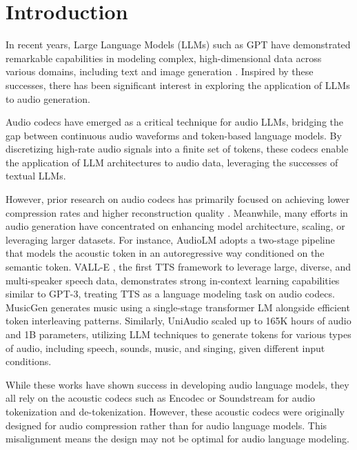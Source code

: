 \section{Introduction}
 
In recent years, Large Language Models (LLMs) such as GPT \cite{brown2020language} have demonstrated remarkable capabilities in modeling complex, high-dimensional data across various domains, including text and image generation \cite{zhao2023survey,liu2024visual}. Inspired by these successes, there has been significant interest \cite{agostinelli2023musiclm,borsos2023audiolm,wang2023neural,yang2023uniaudio} in exploring the application of LLMs to audio generation.

Audio codecs \cite{zeghidour2021soundstream} have emerged as a critical technique for audio LLMs, bridging the gap between continuous audio waveforms and token-based language models. By discretizing high-rate audio signals into a finite set of tokens, these codecs enable the application of LLM architectures to audio data, leveraging the successes of textual LLMs. 

However, prior research on audio codecs has primarily focused on achieving lower compression rates and higher reconstruction quality \cite{kumar2024high,defossez2022high,yang2023hifi}. Meanwhile, many efforts in audio generation have concentrated on enhancing model architecture, scaling, or leveraging larger datasets. For instance, AudioLM \cite{borsos2023audiolm} adopts a two-stage pipeline that models the acoustic token in an autoregressive way conditioned on the semantic token. VALL-E \cite{wang2023neural}, the first TTS framework to leverage large, diverse, and multi-speaker speech data, demonstrates strong in-context learning capabilities similar to GPT-3, treating TTS as a language modeling task on audio codecs. MusicGen \cite{copet2024simple} generates music using a single-stage transformer LM alongside efficient token interleaving patterns. Similarly, UniAudio \cite{yang2023uniaudio} scaled up to 165K hours of audio and 1B parameters, utilizing LLM techniques to generate tokens for various types of audio, including speech, sounds, music, and singing, given different input conditions.

While these works have shown success in developing audio language models, they all rely on the acoustic codecs such as Encodec \cite{defossez2022high} or Soundstream \cite{zeghidour2021soundstream} for audio tokenization and de-tokenization. However, these acoustic codecs were originally designed for audio compression rather than for audio language models. This misalignment means the design may not be optimal for audio language modeling.

